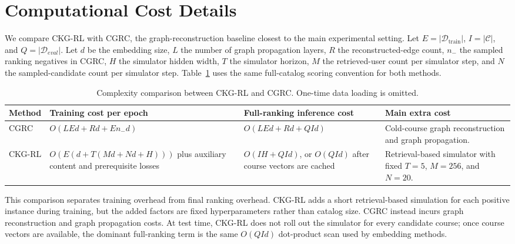 \documentclass[letterpaper]{article}
\newcommand{\tablecaptiongap}{\vspace{0.35em}}
\begin{document}
\clearpage

\section{Computational Cost Details}

We compare CKG-RL with CGRC, the graph-reconstruction baseline closest to the
main experimental setting. Let \(E=|\mathcal{D}_{\mathrm{train}}|\), \(I=|\mathcal{C}|\), and
\(Q=|\mathcal{D}_{eval}|\). Let \(d\) be the embedding size, \(L\) the number of
graph propagation layers, \(R\) the reconstructed-edge count, \(n_{-}\) the
sampled ranking negatives in CGRC, \(H\) the simulator hidden width, \(T\) the
simulator horizon, \(M\) the retrieved-user count per simulator step, and \(N\)
the sampled-candidate count per simulator step. Table~\ref{tab:supp-complexity}
uses the same full-catalog scoring convention for both methods.

\begin{table}[t]
\centering
\caption{Complexity comparison between CKG-RL and CGRC. One-time data loading is omitted.}
\label{tab:supp-complexity}
\tablecaptiongap
\small
\setlength{\tabcolsep}{4.0pt}
\renewcommand{\arraystretch}{1.10}
\begin{tabular}{lp{5.5cm}p{4.6cm}p{4.7cm}}
\toprule
Method & Training cost per epoch & Full-ranking inference cost & Main extra cost \\
\midrule
CGRC & \(O(LEd + Rd + E n_{-}d)\) & \(O(LEd + Rd + QId)\) & Cold-course graph reconstruction and graph propagation. \\
CKG-RL & \(O(E(d + T(Md + Nd + H)))\) plus auxiliary content and prerequisite losses & \(O(IH + QId)\), or \(O(QId)\) after course vectors are cached & Retrieval-based simulator with fixed \(T=5\), \(M=256\), and \(N=20\). \\
\bottomrule
\end{tabular}
\end{table}

This comparison separates training overhead from final ranking overhead. CKG-RL
adds a short retrieval-based simulation for each positive instance during
training, but the added factors are fixed hyperparameters rather than catalog
size. CGRC instead incurs graph reconstruction and graph propagation costs. At
test time, CKG-RL does not roll out the simulator for every candidate course; once
course vectors are available, the dominant full-ranking term is the same
\(O(QId)\) dot-product scan used by embedding methods.
\end{document}

